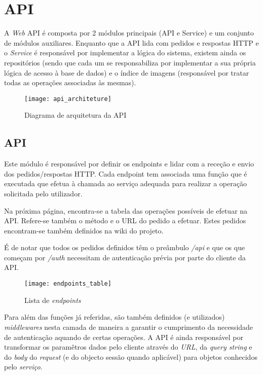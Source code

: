 \section{API}

A \textit{Web} API é composta por 2 módulos principais (API e Service) e um conjunto de módulos auxiliares. Enquanto que a API lida com pedidos e respostas HTTP e o \textit{Service} é responsável por implementar a lógica do sistema, existem ainda os repositórios (sendo que cada um se responsabiliza por implementar a sua própria lógica de acesso à base de dados) e o índice de imagens (responsável por tratar todas as operações associadas às mesmas).

\begin{figure}[h]
	\centering
	\texttt{[image: api\_architeture]}
	\caption{Diagrama de arquitetura da API}
\end{figure}

\subsection{API}
Este módulo é responsável por definir os endpoints e lidar com a receção e envio dos pedidos/respostas HTTP. Cada endpoint tem associada uma função que é executada que efetua à chamada ao serviço adequada para realizar a operação solicitada pelo utilizador. \par \medskip

Na próxima página, encontra-se a tabela das operações possíveis de efetuar na API. Refere-se também o método e o URL do pedido a efetuar. Estes pedidos encontram-se também definidos na wiki do projeto. \par \medskip

É de notar que todos os pedidos definidos têm o preâmbulo \textit{/api} e que os que começam por \textit{/auth} necessitam de autenticação prévia por parte do cliente da API. \par \medskip

\newpage

\begin{figure}[h]
	\centering
	\texttt{[image: endpoints\_table]}
	\caption{Lista de \textit{endpoints}}
\end{figure}

Para além das funções já referidas, são também definidos (e utilizados) \textit{middlewares} nesta camada de maneira a garantir o cumprimento da necessidade de autenticação aquando de certas operações. A API é ainda responsável por transformar os paramêtros dados pelo cliente através do \textit{URL}, da \textit{query string} e do \textit{body} do \textit{request} (e do objecto sessão quando aplicável) para objetos conhecidos pelo \textit{serviço}. \medskip


